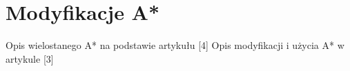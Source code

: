 \section{Modyfikacje A*}

Opis wielostanego A* na podstawie artykułu [4]
\newline
\newline
Opis modyfikacji i użycia A* w artykule [3]
\newline
\newline
